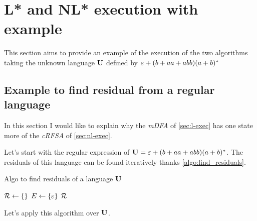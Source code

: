 \section{L* and NL* execution with example}

This section aims to provide an example of the execution of the two algorithms taking the unknown language $\U$ defined by $\varepsilon+(b+aa+abb)(a+b)^*$ %



\subsection{Example to find residual from a regular language}
In this section I would like to explain why the \textit{mDFA} of \cref{sec:l-exec} has one state more of the \textit{cRFSA} of \cref{sec:nl-exec}.

Let's start with the regular expression of $\mathbf{U} = \varepsilon+(b+aa+abb)(a+b)^*$. The residuals of this language can be found iteratively thanks \cref{algo:find_residuals}.


\begin{algorithm}[H]
  \caption{Algo to find residuals of a language $\U$}
  \label{algo:find_residuals}
  \KwIn{$\U$, $\Sigma$}
  $\mathcal{R} \gets \{\}$ 
  $E \gets \{\varepsilon\}$
  \Return $\mathcal{R}$
\end{algorithm}

Let's apply this algorithm over $\U$.

\newcommand{\EM}{\varnothing}

